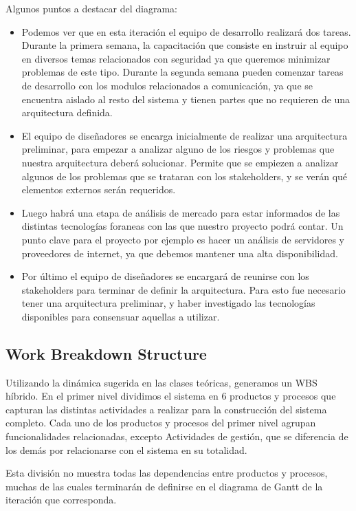 Algunos puntos a destacar del diagrama:
\begin{itemize}
 \item Podemos ver que en esta iteración el equipo de desarrollo realizará dos tareas. Durante la primera semana, la capacitación que consiste en instruir al equipo en diversos temas relacionados con seguridad ya que queremos minimizar problemas de este tipo. Durante la segunda semana pueden comenzar tareas de desarrollo con los modulos relacionados a comunicación, ya que se encuentra aislado al resto del sistema y tienen partes que no requieren de una arquitectura definida.
 \item El equipo de diseñadores se encarga inicialmente de realizar una arquitectura preliminar, para empezar a analizar alguno de los riesgos y problemas que nuestra arquitectura deberá solucionar. Permite que se empiezen a analizar algunos de los problemas que se trataran con los stakeholders, y se ver\'an qu\'e elementos externos serán requeridos.
 \item Luego habr\'a una etapa de an\'alisis de mercado para estar informados de las distintas tecnologías foraneas con las que nuestro proyecto podr\'a contar. Un punto clave para el proyecto por ejemplo es hacer un an\'alisis de servidores y proveedores de internet, ya que debemos mantener una alta disponibilidad.
 \item Por último el equipo de diseñadores se encargará de reunirse con los stakeholders para terminar de definir la arquitectura. Para esto fue necesario tener una arquitectura preliminar, y haber investigado las tecnologías disponibles para consensuar aquellas a utilizar. 
\end{itemize}
\renewcommand{\labelitemi}{}


\subsection{Work Breakdown Structure} 

Utilizando la dinámica sugerida en las clases teóricas, generamos un WBS híbrido. En el primer nivel dividimos el sistema en 6 productos y procesos que capturan las distintas actividades a realizar para la construcción del sistema completo. Cada uno de los productos y procesos del primer nivel agrupan funcionalidades relacionadas, excepto Actividades de gestión, que se diferencia de los demás por relacionarse con el sistema en su totalidad.

Esta división no muestra todas las dependencias entre productos y procesos, muchas de las cuales terminarán de definirse en el diagrama de Gantt de la iteración que corresponda.
\\ \par

